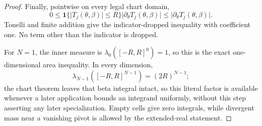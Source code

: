 \begin{proof}
Finally, pointwise on every legal chart domain,
\begin{equation}
\label{eq:appendix-display-102}
0\leq
\mathbf 1\{\lvert T_j(\theta,\beta)\rvert\leq R\}
\lvert\partial_\theta T_j(\theta,\beta)\rvert
\leq
\lvert\partial_\theta T_j(\theta,\beta)\rvert.
\end{equation}
Tonelli and finite addition give the indicator-dropped inequality with coefficient one. No term other than the
indicator is dropped.

For \(N=1\), the inner measure is
\(\lambda_0([-R,R]^0)=1\), so this is the exact one-dimensional area inequality. In every dimension,
\begin{equation}
\label{eq:appendix-display-103}
\lambda_{N-1}([-R,R]^{N-1})=(2R)^{N-1};
\end{equation}
the chart theorem leaves that beta integral intact, so this literal factor is available whenever a later
application bounds an integrand uniformly, without this step asserting any later specialization. Empty cells
give zero integrals, while divergent mass near a vanishing pivot is allowed by the extended-real statement.

\end{proof}


